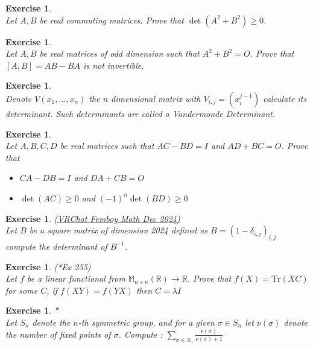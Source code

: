\documentclass[12pt]{article}
\theoremstyle{definition}
\theoremstyle{remark}
\theoremstyle{plain}
\newtheorem{ex}[subsubsection]{Exercise}
\begin{document}
\begin{ex}\leavevmode \\
	Let $ A,B $ be real commuting matrices. Prove that $ \det(A^2+B^2)\geq 0 $.
\end{ex}
\begin{ex}\leavevmode \\
	Let $ A,B $ be real matrices of odd dimension such that $ A^2 + B^2 = O $. Prove that $ [A,B]=AB-BA $ is not invertible.
\end{ex}
\begin{ex}\leavevmode \\
	Denote $ V(x_1,\dots,x_n) $ the $n$ dimensional matrix with $ V_{i,j}=(x_i^{j-1}) $ calculate its determinant. Such determinants are called a \textit{Vandermonde Determinant}.
\end{ex}
\begin{ex}\leavevmode \\
	Let $ A,B,C,D $ be real matrices such that $ AC-BD=I $ and $ AD+BC=O $. Prove that\begin{itemize}
		\item $ CA-DB=I $ and $ DA+CB=O $
		\item $ \det(AC)\geq 0 $ and $ (-1)^n\det(BD)\geq 0 $
	\end{itemize}
\end{ex}
\begin{ex}\textup{\href{https://cdn.artofproblemsolving.com/attachments/6/b/7602596bee912ae3a5085a745ca110424c39d2.pdf}{(VRChat Femboy Math Dec 2024)}}\\
	Let $ B $ be a square matrix of dimension 2024 defined as $B=(1-\delta_{i,j})_{i,j}$ compute the determinant of $ B^{-1} $.
\end{ex}
\begin{ex}\textup{(\cite{GA17}*{Ex 255})}\\
    Let $f$ be a linear functional from $\mathbb{M}_{n \times n}(\mathbb{R}) \to \mathbb{R}$. Prove that $f(X)=\mathrm{Tr}(XC)$ for some $C$, if $f(XY)=f(YX)$ then $C=\lambda I$
\end{ex}
\begin{ex}*\leavevmode \\
Let $S_n$ denote the $n$-th symmetric group, and for a given $\sigma \in S_n$ let $\nu(\sigma)$ denote the number of fixed points of $\sigma$. Compute : $\sum\limits_{\sigma \in S_n}\frac{\epsilon(\sigma)}{\nu(\sigma)+1}$
\end{ex}
\newpage
\end{document}
